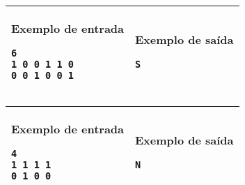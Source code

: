 \newpage
\begin{table}[!h]
\centering
\begin{tabular}{|l|l|}
\hline
\begin{minipage}[t]{3in}
\textbf{Exemplo de entrada}
\begin{verbatim}
6
1 0 0 1 1 0 
0 0 1 0 0 1 
\end{verbatim}
\vspace{1mm}
\end{minipage}
&
\begin{minipage}[t]{3in}
\textbf{Exemplo de saída}
\begin{verbatim}
S
\end{verbatim}
\vspace{1mm}
\end{minipage} \\
\hline
\end{tabular}
\end{table}

\begin{table}[!h]
\centering
\begin{tabular}{|l|l|}
\hline
\begin{minipage}[t]{3in}
\textbf{Exemplo de entrada}
\begin{verbatim}
4
1 1 1 1
0 1 0 0
\end{verbatim}
\vspace{1mm}
\end{minipage}
&
\begin{minipage}[t]{3in}
\textbf{Exemplo de saída}
\begin{verbatim}
N
\end{verbatim}
\vspace{1mm}
\end{minipage} \\
\hline
\end{tabular}
\end{table}
